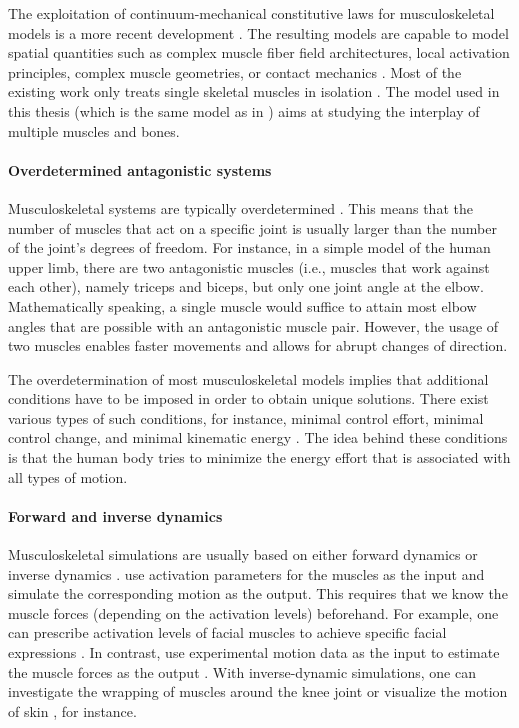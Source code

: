 The exploitation of continuum-mechani\-cal constitutive laws
for musculoskeletal models is a more recent development \cite{Roehrle16Two}.
The resulting models are capable to model spatial quantities
such as complex muscle fiber field architectures,
local activation principles, complex muscle geometries, or contact mechanics
.
Most of the existing work only treats single skeletal muscles in isolation
.
The model used in this thesis
(which is the same model as in
)
aims at studying the interplay of multiple muscles and bones.

\paragraph{Overdetermined antagonistic systems}

Musculoskeletal systems are typically overdetermined \cite{Roehrle16Two}.
This means that the number of muscles that act on a specific joint
is usually larger than the number of the joint's degrees of freedom.
For instance, in a simple model of the human upper limb,
there are two antagonistic muscles
(i.e., muscles that work against each other), namely triceps and biceps,
but only one joint angle at the elbow.
Mathematically speaking, a single muscle would suffice to attain
most elbow angles that are possible with an antagonistic muscle pair.
However, the usage of two muscles enables faster movements and
allows for abrupt changes of direction.

The overdetermination of most musculoskeletal models
implies that additional conditions have to be imposed in order
to obtain unique solutions.
There exist various types of such conditions,
for instance, minimal control effort, minimal control change, and
minimal kinematic energy \cite{Valentin18Gradient}.
The idea behind these conditions is that the human body
tries to minimize the energy effort that is associated with
all types of motion.

\paragraph{Forward and inverse dynamics}

Musculoskeletal simulations are usually based on
either forward dynamics or inverse dynamics \cite{Valentin18Gradient}.
 use activation parameters
for the muscles as the input and simulate the corresponding motion
as the output.
This requires that we know the muscle forces
(depending on the activation levels) beforehand.
For example, one can prescribe activation levels of facial muscles
to achieve specific facial expressions \cite{Wu13Modelling}.
In contrast, 
use experimental motion data as the input
to estimate the muscle forces as the output \cite{Roehrle16Two}.
With inverse-dynamic simulations,
one can investigate the wrapping of muscles
around the knee joint \cite{Fernandez05Anatomically} or
visualize the motion of skin \cite{Lee09Comprehensive}, for instance.



